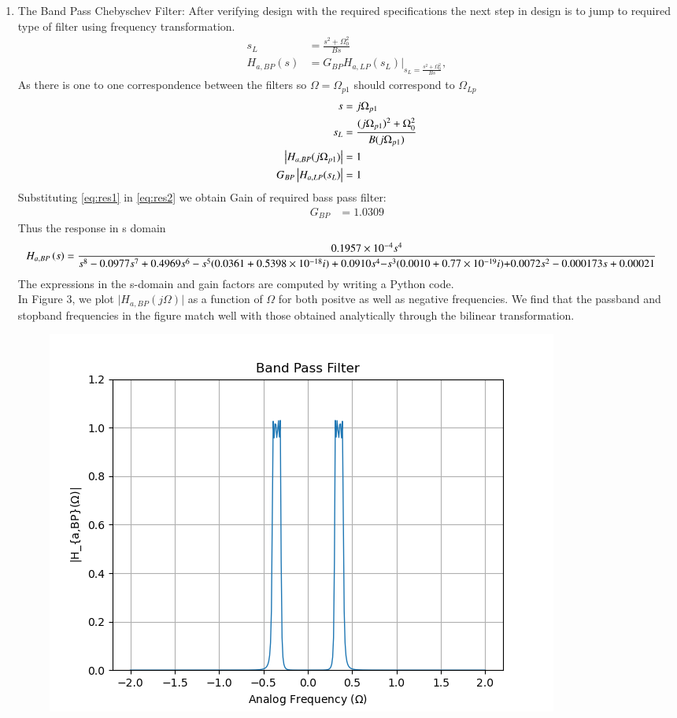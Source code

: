 \documentclass{article}
\begin{document}
\begin{enumerate}
\item {The Band Pass Chebyschev Filter:} 
After verifying design with the required specifications the next step in design is to jump to required type of filter using frequency transformation. 
\begin{align}
    s_L &= \frac{s^2 + \Omega_0^2}{Bs} \\
    H_{a,BP}(s) &= G_{BP}H_{a,LP}(s_L)\vert_{s_L = \frac{s^2 + \Omega_0^2}{Bs}},
\end{align}
As there is one to one correspondence between the filters so $\Omega=\Omega_{p1}$ should correspond to $\Omega_{Lp}$
\begin{align}
    s &= j\Omega_{p1}\\
    s_{L} &= \frac{(j\Omega_{p1})^2 + \Omega_0^2}{B(j\Omega_{p1})} \label{eq:res1} \\ 
    \left\vert H_{a,BP}(j\Omega_{p1})\right\vert &= 1 \\
    G_{BP}\left\vert H_{a,LP}(s_L)\right\vert &= 1 \label{eq:res2}
\end{align}
Substituting \eqref{eq:res1} in \eqref{eq:res2} we obtain Gain of required bass pass filter:
\begin{align}
    G_{BP} &= 1.0309 
\end{align}
Thus the response in s domain 
{\tiny
\begin{align}
    H_{a,BP}\left(s\right) &= \frac{0.1957 \times 10^{-4}s^4}{{s^8 - 0.0977s^7 + 0.4969s^6 - s^5(0.0361+ 0.5398 \times 10^{-18}i) +0.0910s^4}{- s^3(0.0010 + 0.77 \times 10^{-19}i){+ 0.0072s^2 - 0.000173s + 0.00021}}} \label{eq:magnitude_bandpass_sdom}
\end{align}
}
The expressions in the s-domain and gain factors are computed by writing a Python code. \\
In Figure 3, we plot $\vert H_{a,BP}(j\Omega)\vert$ as a function of $\Omega$ for both positve as
well as negative frequencies.  We find that the passband and stopband frequencies in the figure
match well with those obtained analytically through the bilinear transformation.
\begin{figure}[H]
\centering
\includegraphics[width=1\columnwidth]{figs/Band_Pass_Filter.png}

\end{figure}
\end{enumerate}
\end{document}
